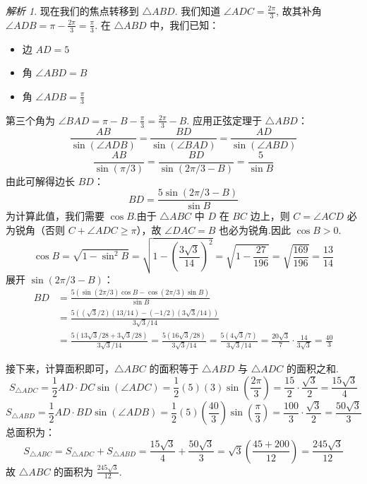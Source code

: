 \documentclass[12pt,a4paper]{ctexbook}
\theoremstyle{definition}
\theoremstyle{remark}
\newtheorem*{solution}{解析}
\begin{document}
\begin{solution}
		现在我们的焦点转移到 $\triangle ABD$.
		我们知道 $\angle ADC = \frac{2\pi}{3}$, 故其补角 $\angle ADB = \pi - \frac{2\pi}{3} = \frac{\pi}{3}$.
		在 $\triangle ABD$ 中，我们已知：
		\begin{itemize}
			\item 边 $AD = 5$
			\item 角 $\angle ABD = B$
			\item 角 $\angle ADB = \frac{\pi}{3}$
		\end{itemize}
		第三个角为 $\angle BAD = \pi - B - \frac{\pi}{3} = \frac{2\pi}{3}-B$.
		应用正弦定理于 $\triangle ABD$：
		\[
		\frac{AB}{\sin(\angle ADB)} = \frac{BD}{\sin(\angle BAD)} = \frac{AD}{\sin(\angle ABD)}
		\]
		\[
		\frac{AB}{\sin(\pi/3)} = \frac{BD}{\sin(2\pi/3 - B)} = \frac{5}{\sin B}
		\]
		由此可解得边长 $BD$：
		\[
		BD = \frac{5\sin(2\pi/3 - B)}{\sin B}
		\]
		为计算此值，我们需要 $\cos B$.由于 $\triangle ABC$ 中 $D$ 在 $BC$ 边上，则 $C = \angle ACD$ 必为锐角（否则 $C+\angle ADC \ge \pi$），故 $\angle DAC = B$ 也必为锐角.因此 $\cos B > 0$.
		\[
		\cos B = \sqrt{1-\sin^2 B} = \sqrt{1 - \left(\frac{3\sqrt{3}}{14}\right)^2} = \sqrt{1-\frac{27}{196}} = \sqrt{\frac{169}{196}} = \frac{13}{14}
		\]
		展开 $\sin(2\pi/3 - B)$：
		\begin{align*}
			BD &= \frac{5(\sin(2\pi/3)\cos B - \cos(2\pi/3)\sin B)}{\sin B} \\
			&= \frac{5((\sqrt{3}/2)(13/14) - (-1/2)(3\sqrt{3}/14))}{3\sqrt{3}/14} \\
			&= \frac{5(13\sqrt{3}/28 + 3\sqrt{3}/28)}{3\sqrt{3}/14} = \frac{5(16\sqrt{3}/28)}{3\sqrt{3}/14} = \frac{5(4\sqrt{3}/7)}{3\sqrt{3}/14} = \frac{20\sqrt{3}}{7} \cdot \frac{14}{3\sqrt{3}} = \frac{40}{3}
		\end{align*}

		接下来，计算面积即可，$\triangle ABC$ 的面积等于 $\triangle ABD$ 与 $\triangle ADC$ 的面积之和.
		\[
		S_{\triangle ADC} = \frac{1}{2}AD \cdot DC \sin(\angle ADC) = \frac{1}{2}(5)(3)\sin\left(\frac{2\pi}{3}\right) = \frac{15}{2} \cdot \frac{\sqrt{3}}{2} = \frac{15\sqrt{3}}{4}
		\]
		\[
		S_{\triangle ABD} = \frac{1}{2}AD \cdot BD \sin(\angle ADB) = \frac{1}{2}(5)\left(\frac{40}{3}\right)\sin\left(\frac{\pi}{3}\right) = \frac{100}{3} \cdot \frac{\sqrt{3}}{2} = \frac{50\sqrt{3}}{3}
		\]
		总面积为：
		\[
		S_{\triangle ABC} = S_{\triangle ADC} + S_{\triangle ABD} = \frac{15\sqrt{3}}{4} + \frac{50\sqrt{3}}{3} = \sqrt{3}\left(\frac{45+200}{12}\right) = \frac{245\sqrt{3}}{12}
		\]
		故 $\triangle ABC$ 的面积为 $\frac{245\sqrt{3}}{12}$.\hfill\qedsymbol
	\end{solution}
\end{document}
